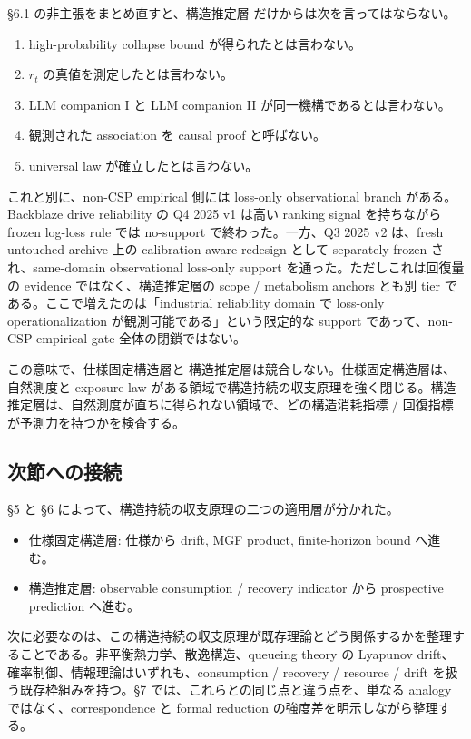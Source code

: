 \documentclass[12pt,a4paper]{article}
\begin{document}
§6.1 の非主張をまとめ直すと、構造推定層 だけからは次を言ってはならない。

\begin{enumerate}
\def\labelenumi{\arabic{enumi}.}
\tightlist
\item
  high-probability collapse bound が得られたとは言わない。
\item
  \(r_{t}\) の真値を測定したとは言わない。
\item
  LLM companion I と LLM companion II が同一機構であるとは言わない。
\item
  観測された association を causal proof と呼ばない。
\item
  universal law が確立したとは言わない。
\end{enumerate}

これと別に、non-CSP empirical 側には loss-only observational branch がある。Backblaze drive reliability の Q4 2025 v1 は高い ranking signal を持ちながら frozen log-loss rule では no-support で終わった。一方、Q3 2025 v2 は、fresh untouched archive 上の calibration-aware redesign として separately frozen され、same-domain observational loss-only support を通った。ただしこれは回復量の evidence ではなく、構造推定層の scope / metabolism anchors とも別 tier である。ここで増えたのは「industrial reliability domain で loss-only operationalization が観測可能である」という限定的な support であって、non-CSP empirical gate 全体の閉鎖ではない。

この意味で、仕様固定構造層と 構造推定層は競合しない。仕様固定構造層は、自然測度と exposure law がある領域で構造持続の収支原理を強く閉じる。構造推定層は、自然測度が直ちに得られない領域で、どの構造消耗指標 / 回復指標が予測力を持つかを検査する。

\subsection{次節への接続}\label{ux6b21ux7bc0ux3078ux306eux63a5ux7d9a-2}

§5 と §6 によって、構造持続の収支原理の二つの適用層が分かれた。

\begin{itemize}
\tightlist
\item
  仕様固定構造層: 仕様から drift, MGF product, finite-horizon bound へ進む。
\item
  構造推定層: observable consumption / recovery indicator から prospective prediction へ進む。
\end{itemize}

次に必要なのは、この構造持続の収支原理が既存理論とどう関係するかを整理することである。非平衡熱力学、散逸構造、queueing theory の Lyapunov drift、確率制御、情報理論はいずれも、consumption / recovery / resource / drift を扱う既存枠組みを持つ。§7 では、これらとの同じ点と違う点を、単なる analogy ではなく、correspondence と formal reduction の強度差を明示しながら整理する。
\end{document}
